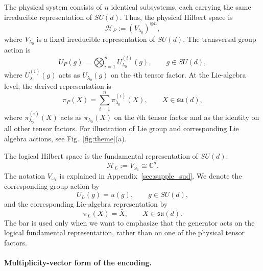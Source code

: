\documentclass[10pt,twocolumn,superscriptaddress,aps,amsmath,amssymb,citeautoscript,floatfix,prx]{revtex4-2}
\newcounter{alg}
\theoremstyle{plain}
\theoremstyle{plain}
\theoremstyle{plain}
\theoremstyle{plain}
\theoremstyle{plain}
\theoremstyle{plain}
\theoremstyle{plain}
\theoremstyle{definition}
\theoremstyle{plain}
\begin{document}
The physical system consists of $n$ identical subsystems, each carrying the same irreducible representation of $SU(d)$. 
Thus, the physical Hilbert space is
\begin{equation}\label{eq:phys_space_rep}
\mathcal H_P
:=
(V_{\lambda_0})^{\otimes n},
\end{equation}
where $V_{\lambda_0}$ is a fixed irreducible representation of $SU(d)$. The transversal group action is
\begin{equation}\label{eq:group_phys_space_rep}
U_P(g)
=
\bigotimes_{i=1}^n
U_{\lambda_0}^{(i)}(g),
\qquad
g\in SU(d),
\end{equation}
where $U_{\lambda_0}^{(i)}(g)$ acts as $U_{\lambda_0}(g)$ on the $i$th tensor factor. At the Lie-algebra level, the derived representation is
\begin{equation}\label{eq:alg_phys_space_rep}
\pi_P(X)
=
\sum_{i=1}^n
\pi_{\lambda_0}^{(i)}(X),
\qquad
X\in\mathfrak{su}(d),
\end{equation}
where $\pi_{\lambda_0}^{(i)}(X)$ acts as $\pi_{\lambda_0}(X)$ on the $i$th tensor factor and as the identity on all other tensor factors. 
For illustration of Lie group and corresponding Lie algebra actions, see Fig.~\ref{fig:theme}(a).

The logical Hilbert space is the fundamental representation of $SU(d)$:
\begin{equation}\label{eq:log_space_rep}
\mathcal H_L
:=
V_{\omega_1}
\cong
\mathbb C^d .
\end{equation}
The notation $V_{\omega_1}$ is explained in Appendix~\ref{sec:supple_sud}. We denote the corresponding group action by
$$
U_L(g)
=
u(g),
\qquad
g\in SU(d),
$$
and the corresponding Lie-algebra representation by
$$
\pi_L(X)
=
\bar X,
\qquad
X\in\mathfrak{su}(d).
$$
The bar is used only when we want to emphasize that the generator acts on the logical fundamental representation, 
rather than on one of the physical tensor factors.

\paragraph{Multiplicity-vector form of the encoding.}
\end{document}
